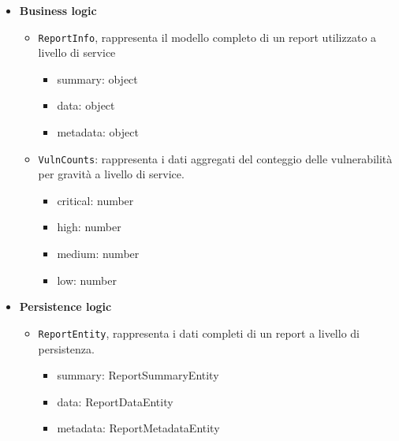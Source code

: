 \documentclass[a4paper, 11pt]{article}
\begin{document}
\begin{itemize}
\begin{itemize}
      \item \texttt{ReportMetadataDto}, rappresenta i dati relativi ai tempi e al bersaglio della scansione.
      \begin{itemize}
          \item startScanTime: string
          \item endScanTime: string
          \item target: ReportTargetDto
      \end{itemize}
    \end{itemize}

  \item \textbf{Business logic}
    \begin{itemize}
      \item \texttt{ReportInfo}, rappresenta il modello completo di un report utilizzato a livello di service
      \begin{itemize}
          \item summary: object
          \item data: object
          \item metadata: object
      \end{itemize}

      \item \texttt{VulnCounts}: rappresenta i dati aggregati del conteggio delle vulnerabilità per gravità a livello di service.
      \begin{itemize}
          \item critical: number
          \item high: number
          \item medium: number
          \item low: number
      \end{itemize}
    \end{itemize}

  \item \textbf{Persistence logic}
  \begin{itemize}
    \item \texttt{ReportEntity}, rappresenta i dati completi di un report a livello di persistenza.
    \begin{itemize}
          \item summary: ReportSummaryEntity
          \item data: ReportDataEntity
          \item metadata: ReportMetadataEntity
      \end{itemize}


\end{itemize}
\end{itemize}
\end{document}
